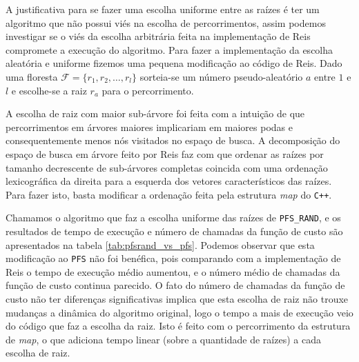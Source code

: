 \documentclass[12pt]{article}
\newcommand{\toolname}[1]{\textit{#1}}
\newcommand{\algname}[1]{\texttt{#1}}
\newcommand{\langname}[1]{\texttt{#1}}
\newcommand{\forest}{\mathcal{F}}
\begin{document}
A justificativa para se fazer uma escolha uniforme entre as raízes é
ter um algoritmo que não possui viés na escolha de percorrimentos, assim 
podemos investigar se o viés da escolha arbitrária feita na 
implementação de Reis compromete a execução do algoritmo. Para fazer a 
implementação da escolha aleatória e 
uniforme fizemos uma pequena modificação ao código de Reis. Dado uma 
floresta $\forest = \{r_1, r_2, \dots, r_l\}$ sorteia-se um número 
pseudo-aleatório $a$ entre $1$ e $l$ e escolhe-se a raiz $r_a$ para o 
percorrimento.

A escolha de raiz com maior sub-árvore foi feita com a intuição de que
percorrimentos em árvores maiores implicariam em maiores podas e 
consequentemente menos nós visitados no espaço de busca. A decomposição
do espaço de busca em árvore feito por Reis faz com que ordenar as 
raízes por tamanho decrescente de sub-árvores completas coincida com 
uma ordenação lexicográfica da direita para a esquerda dos vetores 
característicos das raízes. Para fazer isto, basta modificar a 
ordenação feita pela estrutura \toolname{map} do \langname{C++}.

Chamamos o algoritmo que faz a escolha uniforme das raízes de 
\algname{PFS\_RAND}, e os resultados de tempo de execução e número
de chamadas da função de custo são apresentados na tabela 
\ref{tab:pfsrand_vs_pfs}. Podemos observar que esta modificação ao 
\algname{PFS} não foi benéfica, pois comparando com a implementação de 
Reis o tempo de execução médio aumentou, e o número médio de chamadas da 
função de custo continua parecido. O fato do número de chamadas da 
função de custo não ter diferenças significativas implica que esta 
escolha de raiz não trouxe mudanças a dinâmica do algoritmo original, 
logo o tempo a mais de execução veio do código que faz a escolha da 
raiz. Isto é feito com o percorrimento da estrutura de \toolname{map}, 
o que adiciona tempo linear (sobre a quantidade de raízes) a cada 
escolha de raiz.
\end{document}
